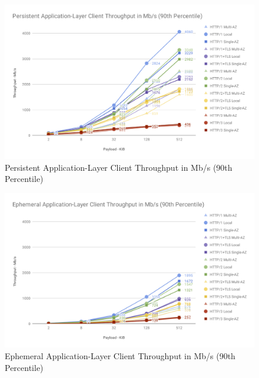 \clearpage

\begin{figure}[h!]
    \centering
    \includegraphics[width=\linewidth]{figures/charts/Persistent Application-Layer Client Throughput in Mb_s (90th Percentile).png}
    \caption{Persistent Application-Layer Client Throughput in Mb/s (90th Percentile)}
    \label{fig:persistent_app_throughput}
\end{figure}
\begin{figure}[h!]
    \centering
    \includegraphics[width=\linewidth]{figures/charts/Ephemeral Application-Layer Client Throughput in Mb_s (90th Percentile).png}
    \caption{Ephemeral Application-Layer Client Throughput in Mb/s (90th Percentile)}
    \label{fig:ephemeral_app_throughput}
\end{figure}

\clearpage

